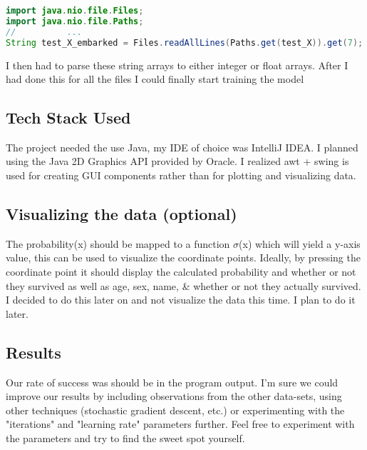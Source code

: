 \documentclass[notitlepage,a4paper,oneside,article,table]{article}
\begin{document}
\begin{lstlisting}[language=Java, caption=Importing the rows from external files]
import java.nio.file.Files;
import java.nio.file.Paths;
//          ...
String test_X_embarked = Files.readAllLines(Paths.get(test_X)).get(7);
\end{lstlisting}

I then had to parse these string arrays to either integer or float arrays. After I had done this for all the files I could finally start training the model


\subsection{Tech Stack Used}

The project needed the use Java, my IDE of choice was IntelliJ IDEA. 
I planned using the Java 2D Graphics API provided by Oracle. I realized awt + swing is used for creating GUI components rather than for plotting and visualizing data. 

\subsection{Visualizing the data (optional)}

The probability(x) should be mapped to a function $\sigma$(x) which will yield a y-axis value, this can be used to visualize the coordinate points. Ideally, by pressing the coordinate point it should display the calculated probability and whether or not they survived as well as age, sex, name, \& whether or not they actually survived. I decided to do this later on and not visualize the data this time. I plan to do it later.

\subsection{Results}
Our rate of success was should be in the program output. I'm sure we could improve our results by including observations from the other data-sets, using other techniques (stochastic gradient descent, etc.) or experimenting with the "iterations" and "learning rate" parameters further. Feel free to experiment with the parameters and try to find the sweet spot yourself.

\end{document}
